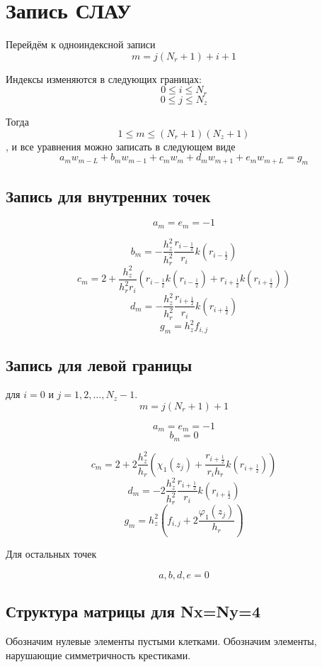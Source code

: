 \section{Запись СЛАУ}

Перейдём к одноиндексной записи
\[ m = j(N_r + 1) + i + 1 \]

Индексы изменяются в следующих границах:
\[ 0 \leq i \leq N_r \]
\[ 0 \leq j \leq N_z \]

Тогда
\[ 1 \le m \le (N_r + 1)(N_z + 1) \]
, и все уравнения можно записать в следующем виде
\[ a_m w_{m - L} + b_m w_{m - 1} + c_m w_m + d_m w_{m + 1} + e_m w_{m + L} = g_m \]

\subsection{Запись для внутренних точек}

\[ a_m = e_m = -1 \]

\[ b_m = -\frac{h_z^2}{h_r^2} \frac{r_{i-\frac{1}{2}}}{r_i} k(r_{i-\frac{1}{2}}) \]
\[ c_m = 2 + \frac{h_z^2}{h_r^2 r_i} \left(r_{i-\frac{1}{2}} k(r_{i-\frac{1}{2}}) + r_{i+\frac{1}{2}} k(r_{i+\frac{1}{2}}) \right) \]
\[ d_m = -\frac{h_z^2}{h_r^2} \frac{r_{i+\frac{1}{2}}}{r_i} k(r_{i+\frac{1}{2}}) \]
\[ g_m = h_z^2 f_{i, j} \]

\subsection{Запись для левой границы}

для $ i = 0 $ и $ j = 1, 2, \dots, N_z - 1$.
\[ m = j(N_r + 1) + 1 \]

\[ a_m = e_m = -1 \]
\[ b_m = 0 \]

\[ c_m = 2 + 2 \frac{h_z^2}{h_r} \left(\chi_1(z_j) + \frac{r_{i+\frac{1}{2}}}{r_i h_r} k(r_{i+\frac{1}{2}}) \right) \]
\[ d_m = -2 \frac{h_z^2}{h_r^2} \frac{r_{i+\frac{1}{2}}}{r_i} k(r_{i+\frac{1}{2}}) \]
\[ g_m = h_z^2 \left(f_{i, j} + 2 \frac{\varphi_1(z_j)}{h_r} \right) \]

Для остальных точек

\[ a,b,d,e = 0 \]

\subsection{Структура матрицы для Nx=Ny=4}

Обозначим нулевые элементы пустыми клетками. Обозначим элементы, нарушающие симметричность крестиками.


